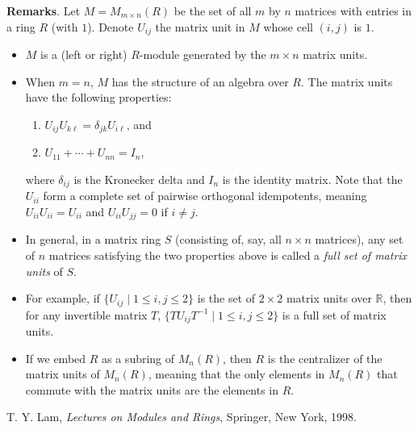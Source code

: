 \documentclass[12pt]{article}
\begin{document}
\textbf{Remarks}.  Let $M=M_{m\times n}(R)$ be the set of all $m$ by $n$ matrices with entries in a ring $R$ (with $1$).  Denote $U_{ij}$ the matrix unit in $M$ whose cell $(i,j)$ is $1$.
\begin{itemize}
\item $M$ is a (left or right) $R$-module generated by the $m\times n$ matrix units.
\item When $m=n$, $M$ has the structure of an algebra over $R$.  The matrix units have the following properties:
\begin{enumerate}
\item $U_{ij}U_{k\ell}=\delta_{jk}U_{i\ell}$, and
\item $U_{11}+\cdots+U_{nn}=I_n$,
\end{enumerate}
where $\delta_{ij}$ is the Kronecker delta and $I_n$ is the identity matrix.  Note that the $U_{ii}$ form a complete set of pairwise orthogonal idempotents, meaning $U_{ii}U_{ii}=U_{ii}$ and $U_{ii}U_{jj}=0$ if $i\ne j$.
\item In general, in a matrix ring $S$ (consisting of, say, all $n\times n$ matrices), any set of $n$ matrices satisfying the two properties above is called a \emph{full set of matrix units} of $S$.  
\item For example, if $\lbrace U_{ij}\mid 1\le i,j\le 2\rbrace$ is the set of $2\times 2$ matrix units over $\mathbb{R}$, then for any invertible matrix $T$, $\lbrace TU_{ij}T^{-1}\mid 1\le i,j\le 2\rbrace$ is a full set of matrix units.
\item If we embed $R$ as a subring of $M_n(R)$, then $R$ is the centralizer of the matrix units of $M_n(R)$, meaning that the only elements in $M_n(R)$ that commute with the matrix units are the elements in $R$.
\end{itemize}

\begin{thebibliography}{9}
 T. Y. Lam, \emph{Lectures on Modules and Rings}, Springer, New York, 1998.
\end{thebibliography}
\end{document}
